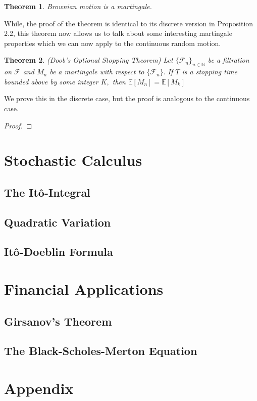 \documentclass[openany, amssymb, psamsfonts]{amsart}
\newtheorem{thm}{Theorem}[section]
\theoremstyle{definition}
\numberwithin{equation}{section}
\newcommand{\bbE}{\mathbb{E}}
\newcommand{\bbN}{\mathbb{N}}
\begin{document}
\begin{thm}
Brownian motion is a martingale.
\end{thm}
While, the proof of the theorem is identical to its discrete version in Proposition 2.2, this theorem now allows us to talk about some interesting martingale properties which we can now apply to the continuous random motion.

\begin{thm}(Doob's Optional Stopping Theorem) Let $\{\mathcal{F}_n\}_{n \in \bbN}$ be a filtration on $\mathcal{F}$ and $M_n$ be a martingale with respect to $\{\mathcal{F}_n\}.$ If $T$ is a stopping time bounded above by some integer $K,$ then $\bbE[M_n] = \bbE[M_k]$
\end{thm}
We prove this in the discrete case, but the proof is analogous to the continuous case.

\begin{proof}
\end{proof}




\section{Stochastic Calculus}
\subsection{The It\^{o}-Integral}
\subsection{Quadratic Variation}
\subsection{It\^{o}-Doeblin Formula}
\section{Financial Applications}
\subsection{Girsanov's Theorem}
\subsection{The Black-Scholes-Merton Equation}
\section{Appendix}
\end{document}
